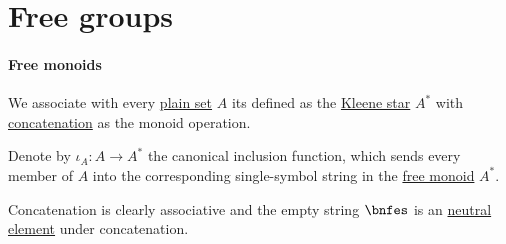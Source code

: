 \section{Free groups}\label{sec:free_groups}

\paragraph{Free monoids}

\begin{definition}\label{def:free_monoid}
  We associate with every \hyperref[def:set]{plain set} \( A \) its  defined as the \hyperref[def:formal_language/kleene_star]{Kleene star} \( A^* \) with \hyperref[def:formal_language/concatenation]{concatenation} as the monoid operation.

  Denote by \( \iota_A: A \to A^* \) the canonical inclusion function, which sends every member of \( A \) into the corresponding single-symbol string in the \hyperref[def:free_monoid]{free monoid} \( A^* \).
\end{definition}
\begin{defproof}
  Concatenation is clearly associative and the empty string \( \bnfes \) is an \hyperref[def:monoid]{neutral element} under concatenation.
\end{defproof}


